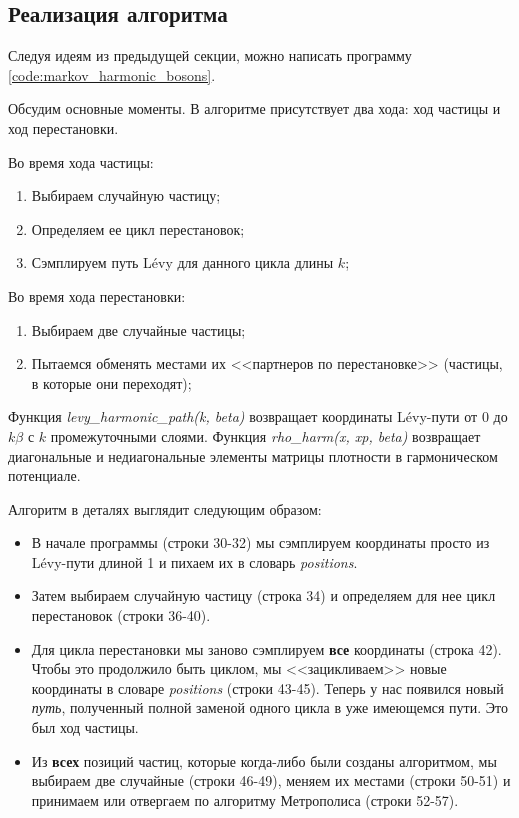 \begin{lecture}
\section{Реализация алгоритма}
Следуя идеям из предыдущей секции, можно написать программу \ref{code:markov_harmonic_bosons}.


Обсудим основные моменты.
В алгоритме присутствует два хода: ход частицы и ход перестановки.

Во время хода частицы:
\begin{enumerate}
    \item Выбираем случайную частицу;
    \item Определяем ее цикл перестановок;
    \item Сэмплируем путь Lévy для данного цикла длины $k$;
\end{enumerate}

Во время хода перестановки:
\begin{enumerate}
    \item Выбираем две случайные частицы;
    \item Пытаемся обменять местами их <<партнеров по перестановке>> (частицы, в которые они переходят);
\end{enumerate}

Функция \textit{levy\_harmonic\_path(k, beta)} возвращает координаты Lévy-пути от $0$ до $k\beta$ с $k$ промежуточными слоями.
Функция \textit{rho\_harm(x, xp, beta)} возвращает диагональные и недиагональные элементы матрицы плотности в гармоническом потенциале.

Алгоритм в деталях выглядит следующим образом:
\begin{itemize}
    \item В начале программы (строки 30-32) мы сэмплируем координаты просто из Lévy-пути длиной 1 и пихаем их в словарь \textit{positions}.
    \item Затем выбираем случайную частицу (строка 34) и определяем для нее цикл перестановок (строки 36-40).
    \item Для цикла перестановки мы заново сэмплируем \textbf{все} координаты (строка 42). Чтобы это продолжило быть циклом, мы <<зацикливаем>> новые координаты в словаре \textit{positions} (строки 43-45). Теперь у нас появился новый \textit{путь}, полученный полной заменой одного цикла в уже имеющемся пути. Это был ход частицы.
    \item Из \textbf{всех} позиций частиц, которые когда-либо были созданы алгоритмом, мы выбираем две случайные (строки 46-49), меняем их местами (строки 50-51) и принимаем или отвергаем по алгоритму Метрополиса (строки 52-57).
\end{itemize}


\end{lecture}
